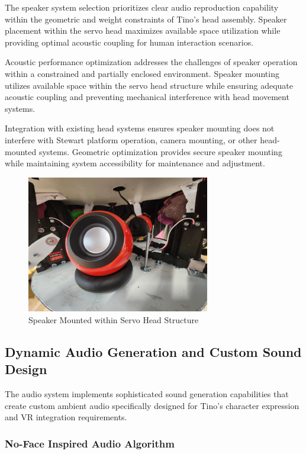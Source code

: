 The speaker system selection prioritizes clear audio reproduction capability within the geometric and weight constraints of Tino's head assembly. Speaker placement within the servo head maximizes available space utilization while providing optimal acoustic coupling for human interaction scenarios.

Acoustic performance optimization addresses the challenges of speaker operation within a constrained and partially enclosed environment. Speaker mounting utilizes available space within the servo head structure while ensuring adequate acoustic coupling and preventing mechanical interference with head movement systems.

Integration with existing head systems ensures speaker mounting does not interfere with Stewart platform operation, camera mounting, or other head-mounted systems. Geometric optimization provides secure speaker mounting while maintaining system accessibility for maintenance and adjustment.
\begin{figure}[H]
    \centering
    \includegraphics[height=6cm]{Images/SpeakerSetup (2).jpg}
    \caption{Speaker Mounted within Servo Head Structure}
    \label{fig:speaker_mount}
\end{figure}

\subsection{Dynamic Audio Generation and Custom Sound Design}

The audio system implements sophisticated sound generation capabilities that create custom ambient audio specifically designed for Tino's character expression and VR integration requirements.

\subsubsection{No-Face Inspired Audio Algorithm}

